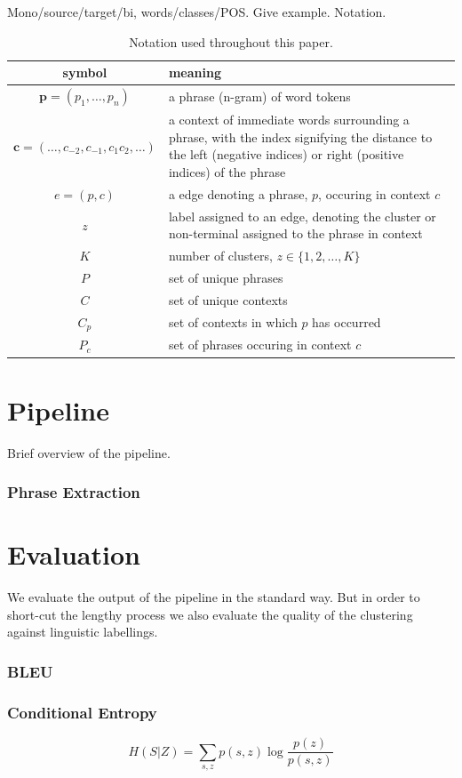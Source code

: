 Mono/source/target/bi, words/classes/POS.
Give example.
Notation.

\begin{table}
\begin{tabular}{cp{}}
\toprule
  symbol & meaning \\
\midrule
  $\mathbf{p} = (p_1, \ldots, p_n)$ & a phrase (n-gram) of word tokens \\
  $\mathbf{c} = (\ldots, c_{-2}, c_{-1}, c_1 c_2, \ldots)$ & a context of immediate words surrounding a phrase, with the index signifying the distance to the left (negative indices) or right (positive indices) of the phrase \\
  $e = (p, c)$  & a edge denoting a phrase, $p$, occuring in context $c$ \\
  $z$ & label assigned to an edge, denoting the cluster or non-terminal assigned to the phrase in context \\
  $K$ & number of clusters, $z \in \{1,2, \ldots, K\}$ \\
  $P$ & set of unique phrases \\
  $C$ & set of unique contexts \\
  $C_p$ & set of contexts in which $p$ has occurred \\
  $P_c$ & set of phrases occuring in context $c$ \\
\bottomrule
\end{tabular}
\caption{Notation used throughout this paper.}
\end{table}

\section{Pipeline}

Brief overview of the pipeline. 

\subsubsection{Phrase Extraction}

\section{Evaluation}

We evaluate the output of the pipeline in the standard way. But in order to short-cut the lengthy process we also evaluate the quality of the clustering against linguistic labellings.

\subsubsection{BLEU}

\subsubsection{Conditional Entropy}

\[ H(S|Z) = \sum_{s,z} p(s,z) \log \frac{p(z)}{p(s,z)} \]


